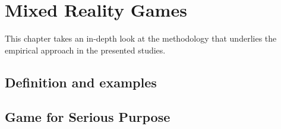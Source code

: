 \section{Mixed Reality Games}\label{ch:game}
This chapter takes an in-depth look at the methodology that underlies the empirical approach in the presented studies.\\

\subsection{Definition and examples}


\subsection{Game for Serious Purpose}